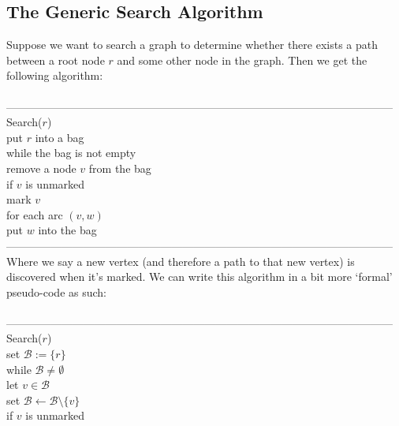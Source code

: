 \documentclass{article}
\newcommand{\emp}{\emptyset}
\newcommand{\mcal}[1]{\mathcal{#1}}
\begin{document}
\subsection{The Generic Search Algorithm}
Suppose we want to search a graph to determine whether there exists a path between a root node $r$ and some other node in the graph. Then we get the following algorithm:\\\\
---------------------------------------------------------------------------------------------------------
Search($r$)\\
	\hspace*{7mm} put $r$ into a bag\\
	\hspace*{14mm} while the bag is not empty\\
	\hspace*{21mm} remove a node $v$ from the bag\\
	\hspace*{21mm} if $v$ is unmarked\\
	\hspace*{28mm} mark $v$\\
	\hspace*{28mm} for each arc $(v, w)$\\
	\hspace*{35mm} put $w$ into the bag\\
---------------------------------------------------------------------------------------------------------\\
Where we say a new vertex (and therefore a path to that new vertex) is discovered when it's marked. We can write this algorithm in a bit more `formal' pseudo-code as such:\\\\
---------------------------------------------------------------------------------------------------------
Search($r$)\\
	\hspace*{7mm} set $\mcal{B} := \{r\}$\\
	\hspace*{14mm} while $\mcal{B} \neq \emp$\\
	\hspace*{21mm} let $v \in \mcal{B}$\\
	\hspace*{21mm} set $\mcal{B} \leftarrow \mcal{B} \setminus \{v\}$\\
	\hspace*{21mm} if $v$ is unmarked\\
\end{document}
